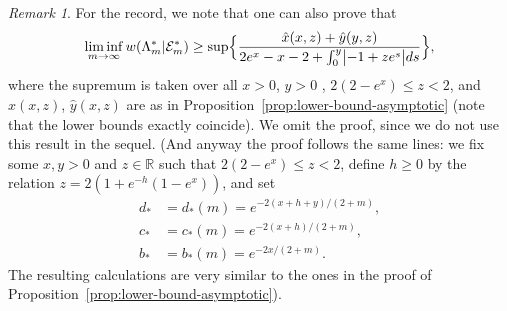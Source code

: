 \documentclass[a4paper]{amsart} %
\newtheorem{proposition}[theorem]{Proposition} %
\theoremstyle{definition}
\theoremstyle{remark}
\newtheorem{remark}[theorem]{Remark}
\numberwithin{equation}{section}
\newcommand*{\RR}{\mathbb{R}}
\newcommand*{\weakconstrestricted}[2]{w(#1|#2)} %
\newcommand*{\fclassStar}[1]{\mathcal{E}_{#1}^*}
\newcommand*{\bStar}{b_*}
\newcommand*{\cStar}{c_*}
\newcommand*{\dStar}{d_*}
\newcommand*{\xStar}{x}
\newcommand*{\yStar}{y}
\newcommand*{\zStar}{z}
\newcommand*{\hStar}{h}
\newcommand*{\xGain}{\hat{x}}
\newcommand*{\yGain}{\hat{y}}
\begin{document}
\begin{remark}
	\label{rem:asymptotic-star-for-the-record}
	For the record, we
	note that one can 
	also prove 
	that
	\begin{equation*}
	\liminf_{m\to \infty} \weakconstrestricted{\Lambda_m^*}{\fclassStar{m}} 
	\\
	\geq 
	\sup\Bigl\{ 
	\frac{\xGain(x,z) + \yGain(y,z)}{ 2e^{x} -x - 2  +  \int_{0}^{y} \bigl| -1 +  z  e^{s}\bigr| ds}
	\Bigr\},
	\end{equation*}
	where the supremum is taken over all
	$ x>0$, $y >0$ , $2(2-e^x) \leq z < 2 $, and
	$\xGain(x,z)$, $\yGain(x,z)$ are as in Proposition~\ref{prop:lower-bound-asymptotic}
	(note that the lower bounds exactly coincide).
	We omit the proof, since we do not use this result in the sequel.
	(And anyway the proof follows the same lines: we fix some $\xStar, \yStar >0$ and $\zStar\in\RR$ such that $2(2-e^{\xStar}) \leq \zStar < 2$,
	define $\hStar\geq 0$ by the relation $\zStar = 2(1 + e^{-\hStar}(1-e^{\xStar}))$,
	and	set
	\begin{align*}
	\dStar &= \dStar(m) = e^{-2(\xStar+\hStar+\yStar)/(2+m)},\\
	\cStar &= \cStar(m)  =e^{-2(\xStar  +\hStar)/(2+m)},\\
	\bStar &= \bStar(m) = e^{-2\xStar/(2+m)}.
	\end{align*}
	The resulting calculations are very similar to the ones in the proof of Proposition~\ref{prop:lower-bound-asymptotic}).
\end{remark}
%
%
%
%
%
%
%
%
%
\end{document}
